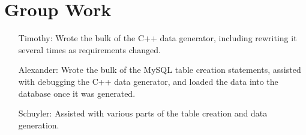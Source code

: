 \documentclass[american,extrafontsizes,12pt,portrait,letterpaper,oneside,onecolumn,article,final]{memoir}
\begin{document}
\section*{Group Work}
%
\begin{samepage}%
\begin{enumerate}[leftmargin=*,widest={Alexander:}]

\item[Timothy:]
%
Wrote the bulk of the C++ data generator, including rewriting it several times as requirements changed.

\item[Alexander:]
%
Wrote the bulk of the MySQL table creation statements, assisted with debugging the C++ data generator, and loaded the data into the database once it was generated.

\item[Schuyler:]
%
Assisted with various parts of the table creation and data generation.

\end{enumerate}%
\end{samepage}
\end{document}
